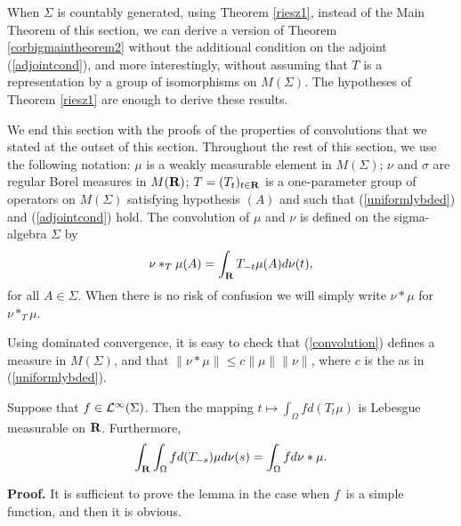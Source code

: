 \begin{8nov94remark}
{\rm 
When $\Sigma$ is countably generated, using 
Theorem \ref{riesz1}, instead of the Main Theorem of
this section, we can derive a version
of Theorem \ref{corbigmaintheorem2}
without the additional condition on the 
adjoint (\ref{adjointcond}), and more interestingly, 
without assuming that $T$ is a representation by a group of 
isomorphisms on $M(\Sigma)$.  The hypotheses of Theorem \ref{riesz1}
are enough to derive these results. 
}
\label{8nov94remark}
\end{8nov94remark}
We end this section with the proofs of the properties of
convolutions that we stated at the outset of this section.
Throughout the rest of this section, we
use the following notation:
$\mu$ is a weakly measurable element in $M(\Sigma)$;
$\nu$ and $\sigma$ are regular Borel measures in $M(\R)$;
$T=(T_t)_{t\in\R}$ is a one-parameter group of
operators on $M(\Sigma)$ satisfying hypothesis $(A)$ and
such that (\ref{uniformlybded}) and (\ref{adjointcond}) hold. 
The convolution of $\mu$ and $\nu$ is defined on the 
sigma-algebra $\Sigma$ by
\begin{equation}
\nu*_T\mu(A)=\int_\R T_{-t}\mu(A)d \nu(t),
\label{convolution}
\end{equation}
for all $A\in \Sigma$.  When there is no risk
of confusion we will simply write $\nu*\mu$ for $\nu*_T\mu$.


Using dominated 
convergence, it is easy to check that (\ref{convolution}) 
defines a measure in $M(\Sigma)$, and that 
$\|\nu*\mu\|\leq c \|\mu\| \|\nu\|$, 
where $c$ is the as in (\ref{uniformlybded}).  
\begin{applem1}
Suppose that $f\in {\cal L}^\infty(\Sigma)$.  
Then the mapping
$t\mapsto \int_\Omega fd(T_t\mu)$
is Lebesgue measurable on $\R$.  Furthermore, 
\begin{equation}
\int_\R\int_\Omega f d(T_{-s})\mu d\nu(s)=\int_\Omega f d\nu*\mu.
\label{8nov94(3)}
\end{equation}
\label{applem1}
\end{applem1}
{\bf Proof.}  It is sufficient to prove the lemma in the case when $f$\
is a simple function, and then it is obvious.

